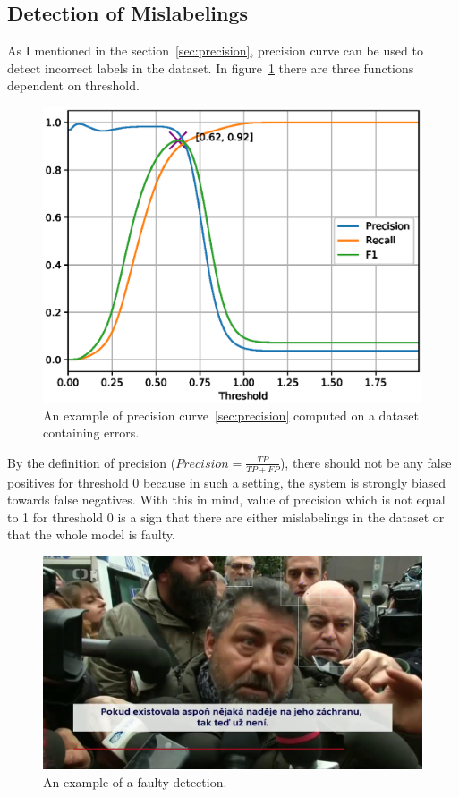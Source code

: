 \subsection{Detection of Mislabelings}\label{subsec:detection-mislabelings}
As I mentioned in the section~\ref{sec:precision}, precision curve can be used to detect incorrect labels in the
dataset.
In figure~\ref{fig:faulty_prft} there are three functions dependent on threshold.

\begin{figure}[H]
    \centering
    \includegraphics[width=0.95\columnwidth]{images/implementation/faulty_prft.eps}
    \caption{An example of precision curve~\ref{sec:precision} computed on a dataset containing errors.}
    \label{fig:faulty_prft}
\end{figure}

By the definition of precision ($Precision = \frac{TP}{TP+FP}$), there should not be any false positives
for threshold 0 because in such a setting, the system is strongly biased towards false negatives.
With this in mind, value of precision which is not equal to 1 for threshold 0 is a sign that there are either
mislabelings in the dataset or that the whole model is faulty.

\begin{figure}[H]
    \centering
    \includegraphics[width=0.9\columnwidth]{images/implementation/faulty_detection.jpg}
    \caption{An example of a faulty detection.}
    \label{fig:faulty_bbox}
\end{figure}

